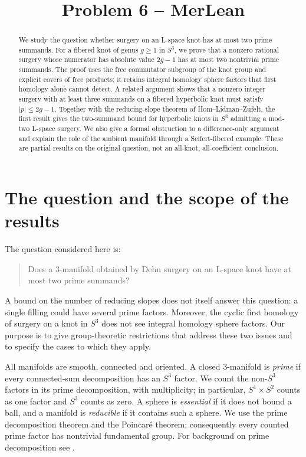 \documentclass[11pt]{article}
\title{Problem 6 -- MerLean}
\author{}
\date{}
\theoremstyle{remark}
\begin{document}
\maketitle

\begin{abstract}
We study the question whether surgery on an L-space knot has at most two prime summands. For a fibered knot of genus $g\geq1$ in $S^3$, we prove that a nonzero rational surgery whose numerator has absolute value $2g-1$ has at most two nontrivial prime summands. The proof uses the free commutator subgroup of the knot group and explicit covers of free products; it retains integral homology sphere factors that first homology alone cannot detect. A related argument shows that a nonzero integer surgery with at least three summands on a fibered hyperbolic knot must satisfy $|p|\leq2g-1$. Together with the reducing-slope theorem of Hom--Lidman--Zufelt, the first result gives the two-summand bound for hyperbolic knots in $S^3$ admitting a mod-two L-space surgery. We also give a formal obstruction to a difference-only argument and explain the role of the ambient manifold through a Seifert-fibered example. These are partial results on the original question, not an all-knot, all-coefficient conclusion.
\end{abstract}

\section{The question and the scope of the results}

The question considered here is:
\begin{quote}
Does a $3$-manifold obtained by Dehn surgery on an L-space knot have at most two prime summands?
\end{quote}
A bound on the number of reducing slopes does not itself answer this question: a single filling could have several prime factors. Moreover, the cyclic first homology of surgery on a knot in $S^3$ does not see integral homology sphere factors. Our purpose is to give group-theoretic restrictions that address these two issues and to specify the cases to which they apply.

All manifolds are smooth, connected and oriented. A closed $3$-manifold is \emph{prime} if every connected-sum decomposition has an $S^3$ factor. We count the non-$S^3$ factors in its prime decomposition, with multiplicity; in particular, $S^1\times S^2$ counts as one factor and $S^3$ counts as zero. A sphere is \emph{essential} if it does not bound a ball, and a manifold is \emph{reducible} if it contains such a sphere. We use the prime decomposition theorem and the Poincar\'e theorem; consequently every counted prime factor has nontrivial fundamental group. For background on prime decomposition see \cite[Section~1.1]{Hatcher}.
\end{document}
